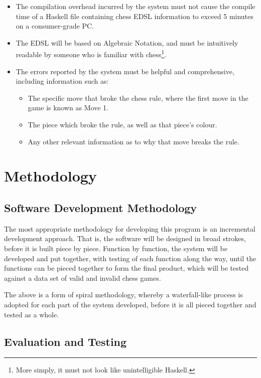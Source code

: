 \documentclass[12pt, a4paper]{scrartcl}
\begin{document}
\begin{itemize}
    \item The compilation overhead incurred by the system must not cause the compile time of a Haskell file containing chess EDSL information to exceed 5 minutes on a consumer-grade PC.
    \item The EDSL will be based on Algebraic Notation, and must be intuitively readable by someone who is familiar with chess\footnote{More simply, it must not look like unintelligible Haskell.}.
    \item The errors reported by the system must be helpful and comprehensive, including information such as:
          \begin{itemize}
              \item The specific move that broke the chess rule, where the first move in the game is known as Move 1.
              \item The piece which broke the rule, as well as that piece's colour.
              \item Any other relevant information as to why that move breaks the rule.
          \end{itemize}
\end{itemize}

\section{Methodology}

\subsection{Software Development Methodology}

The most appropriate methodology for developing this program is an incremental development approach. That is, the software will be designed in broad strokes, before it is built piece by piece. Function by function, the system will be developed and put together, with testing of each function along the way, until the functions can be pieced together to form the final product, which will be tested against a data set of valid and invalid chess games.

The above is a form of spiral methodology, whereby a waterfall-like process is adopted for each part of the system developed, before it is all pieced together and tested as a whole.

\subsection{Evaluation and Testing}
\end{document}
